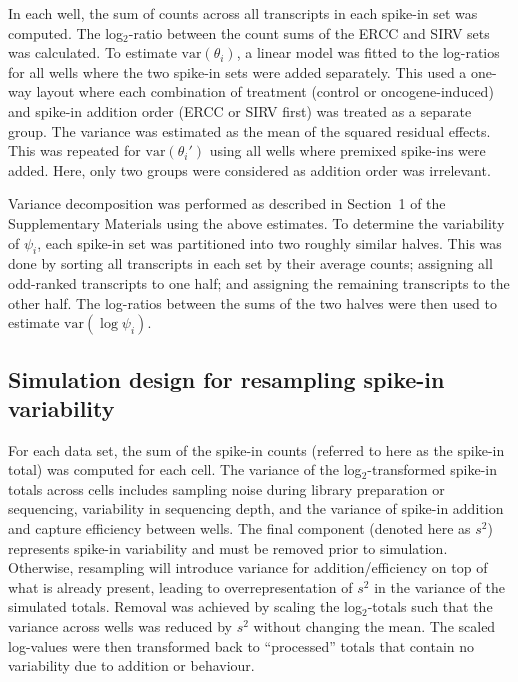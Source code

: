 \documentclass{article}
\begin{document}
In each well, the sum of counts across all transcripts in each spike-in set was computed.
The log$_2$-ratio between the count sums of the ERCC and SIRV sets was calculated.
To estimate $\mbox{var}(\theta_i)$, a linear model was fitted to the log-ratios for all wells where the two spike-in sets were added separately.
This used a one-way layout where each combination of treatment (control or oncogene-induced) and spike-in addition order (ERCC or SIRV first) was treated as a separate group.
The variance was estimated as the mean of the squared residual effects.
This was repeated for $\mbox{var}(\theta_i')$ using all wells where premixed spike-ins were added.
Here, only two groups were considered as addition order was irrelevant.

Variance decomposition was performed as described in Section~1 of the Supplementary Materials using the above estimates.
To determine the variability of $\psi_i$, each spike-in set was partitioned into two roughly similar halves.
This was done by sorting all transcripts in each set by their average counts; assigning all odd-ranked transcripts to one half; and assigning the remaining transcripts to the other half.
The log-ratios between the sums of the two halves were then used to estimate $\mbox{var}(\log \psi_i)$.

\subsection{Simulation design for resampling spike-in variability}
For each data set, the sum of the spike-in counts (referred to here as the spike-in total) was computed for each cell.
The variance of the log$_2$-transformed spike-in totals across cells includes sampling noise during library preparation or sequencing, variability in sequencing depth, and the variance of spike-in addition and capture efficiency between wells.
The final component (denoted here as $s^2$) represents spike-in variability and must be removed prior to simulation.
Otherwise, resampling will introduce variance for addition/efficiency on top of what is already present, leading to overrepresentation of $s^2$ in the variance of the simulated totals.
Removal was achieved by scaling the log$_2$-totals such that the variance across wells was reduced by $s^2$ without changing the mean.
The scaled log-values were then transformed back to ``processed'' totals that contain no variability due to addition or behaviour.
\end{document}
